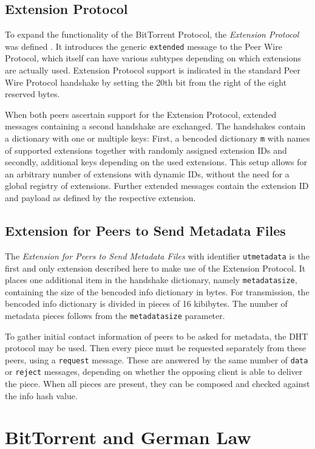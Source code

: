 \documentclass[10pt, a4paper, twoside, headsepline]{scrbook}
\renewcommand{\_}{\origunderscore\allowbreak}
\begin{document}
\subsection{Extension Protocol}
To expand the functionality of the BitTorrent Protocol, the \emph{Extension Protocol} was defined \cite{bep10}. It introduces the generic \texttt{extended} message to the Peer Wire Protocol, which itself can have various subtypes depending on which extensions are actually used. Extension Protocol support is indicated in the standard Peer Wire Protocol handshake by setting the 20th bit from the right of the eight reserved bytes.

When both peers ascertain support for the Extension Protocol, extended messages containing a second handshake are exchanged. The handshakes contain a dictionary with one or multiple keys: First, a bencoded dictionary \texttt{m} with names of supported extensions together with randomly assigned extension IDs and secondly, additional keys depending on the used extensions. This setup allows for an arbitrary number of extensions with dynamic IDs, without the need for a global registry of extensions. Further extended messages contain the extension ID and payload as defined by the respective extension.

\subsection{Extension for Peers to Send Metadata Files}
The \emph{Extension for Peers to Send Metadata Files} \cite{bep9} with identifier \texttt{ut\_metadata} is the first and only extension described here to make use of the Extension Protocol. It places one additional item in the handshake dictionary, namely \texttt{metadata\_size}, containing the size of the bencoded info dictionary in bytes. For transmission, the bencoded info dictionary is divided in pieces of 16 kibibytes. The number of metadata pieces follows from the \texttt{metadata\_size} parameter.

To gather initial contact information of peers to be asked for metadata, the DHT protocol may be used. Then every piece must be requested separately from these peers, using a \texttt{request} message. These are answered by the same number of \texttt{data} or \texttt{reject} messages, depending on whether the opposing client is able to deliver the piece. When all pieces are present, they can be composed and checked against the info hash value.

\section{BitTorrent and German Law}
\label{law}
\end{document}
